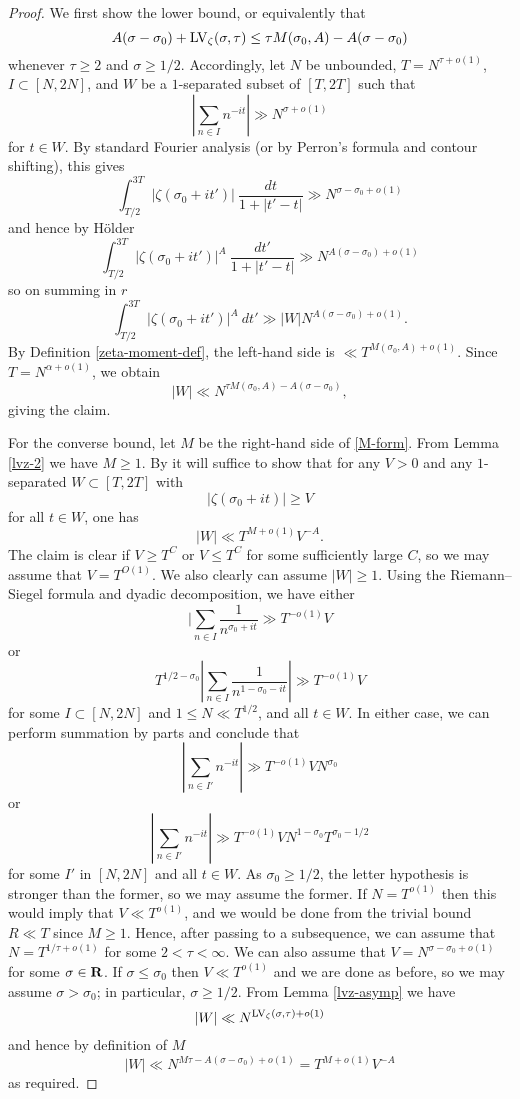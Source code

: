 \begin{proof}  We first show the lower bound, or equivalently that
$$ A(\sigma-\sigma_0) + \mathrm{LV}_\zeta(\sigma,\tau) \leq \tau M(\sigma_0,A) - A(\sigma-\sigma_0)$$
whenever $\tau \geq 2$ and $\sigma \geq 1/2$.  Accordingly, let $N$ be unbounded, $T = N^{\tau+o(1)}$, $I \subset [N,2N]$, and $W$ be a $1$-separated subset of $[T,2T]$ such that
$$ |\sum_{n \in I} n^{-it}| \gg N^{\sigma+o(1)}$$
for $t \in W$. By standard Fourier analysis (or by Perron's formula and contour shifting), this gives
$$ \int_{T/2}^{3T} |\zeta(\sigma_0+it')|\ \frac{dt}{1+|t'-t|} \gg N^{\sigma - \sigma_0 + o(1)}$$
and hence by H\"older
$$ \int_{T/2}^{3T} |\zeta(\sigma_0+it')|^A\ \frac{dt'}{1+|t'-t|} \gg N^{A(\sigma - \sigma_0) + o(1)}$$
so on summing in $r$
$$ \int_{T/2}^{3T} |\zeta(\sigma_0+it')|^A\ dt' \gg |W| N^{A(\sigma - \sigma_0) + o(1)}.$$
By Definition \ref{zeta-moment-def}, the left-hand side is $\ll T^{M(\sigma_0,A)+o(1)}$.  Since $T = N^{\alpha+o(1)}$, we obtain
$$ |W| \ll N^{\tau M(\sigma_0,A) - A(\sigma-\sigma_0)},$$
giving the claim.

For the converse bound, let $M$ be the right-hand side of \eqref{M-form}.  From Lemma \ref{lvz-2} we have $M \geq 1$. By \cite[\S 8.1]{ivic} it will suffice to show that for any $V>0$ and any $1$-separated $W \subset [T,2T]$ with
$$ |\zeta(\sigma_0+it)| \geq V$$
for all $t \in W$, one has
$$ |W| \ll T^{M+o(1)} V^{-A}.$$
The claim is clear if $V \geq T^C$ or $V \leq T^C$ for some sufficiently large $C$, so we may assume that $V = T^{O(1)}$.  We also clearly can assume $|W|\geq 1$.  Using the Riemann--Siegel formula \cite[Theorem 4.1]{ivic} and dyadic decomposition, we have either
$$ |\sum_{n \in I} \frac{1}{n^{\sigma_0+it}} \gg T^{-o(1)} V$$
or
$$ T^{1/2-\sigma_0} |\sum_{n \in I} \frac{1}{n^{1-\sigma_0-it}}| \gg T^{-o(1)} V$$
for some $I \subset [N,2N]$ and $1 \leq N \ll T^{1/2}$, and all $t \in W$.  In either case, we can perform summation by parts and conclude that
$$ |\sum_{n \in I'} n^{-it}|\gg T^{-o(1)} V N^{\sigma_0}$$
or
$$ |\sum_{n \in I'} n^{-it}|\gg T^{-o(1)} V N^{1-\sigma_0} T^{\sigma_0-1/2}$$
for some $I'$ in $[N,2N]$ and all $t \in W$.  As $\sigma_0 \geq 1/2$, the letter hypothesis is stronger than the former, so we may assume the former.  If $N = T^{o(1)}$ then this would imply that $V \ll T^{o(1)}$, and we would be done from the trivial bound $R \ll T$ since $M \geq 1$.
Hence, after passing to a subsequence, we can assume that $N = T^{1/\tau+o(1)}$ for some $2 < \tau < \infty$.  We can also assume that $V = N^{\sigma-\sigma_0+o(1)}$ for some $\sigma \in \mathbf{R}$. If $\sigma \leq \sigma_0$ then $V \ll T^{o(1)}$ and we are done as before, so we may assume $\sigma > \sigma_0$; in particular, $\sigma \geq 1/2$.  From Lemma \ref{lvz-asymp} we have
$$ |W| \ll N^{\mathrm{LV}_\zeta(\sigma,\tau)+o(1)}$$
and hence by definition of $M$
$$ |W| \ll N^{M \tau - A (\sigma-\sigma_0)+o(1)} = T^{M+o(1)} V^{-A}$$
as required.
\end{proof}

